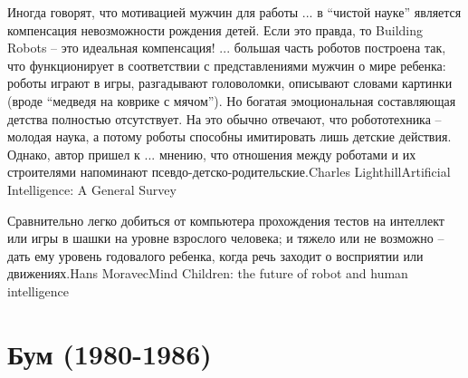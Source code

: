 \documentclass[24pt,pdf,hyperref={unicode},aspectratio=169]{beamer}
\begin{document}
\begin{frame}
\end{frame}

\begin{frame}
\citate
{\small
Иногда говорят, что мотивацией мужчин для работы ... в ``чистой науке'' является компенсация невозможности рождения детей. Если это правда, то Building Robots -- это идеальная компенсация! ... большая часть роботов построена так, что функционирует в соответствии с представлениями мужчин о мире ребенка: роботы играют в игры, разгадывают головоломки, описывают словами картинки (вроде ``медведя на коврике с мячом''). Но богатая эмоциональная составляющая детства полностью отсутствует. На это обычно отвечают, что робототехника -- молодая наука, а потому роботы способны имитировать лишь детские действия. Однако, автор пришел к ... мнению, что отношения между роботами и их строителями напоминают псевдо-детско-родительские.}{Charles Lighthill}{Artificial Intelligence: A General Survey}
\end{frame}

\begin{frame}
\end{frame}

\begin{frame}
\citate
{\small
Сравнительно легко добиться от компьютера прохождения тестов на интеллект или игры в шашки на уровне взрослого человека; и тяжело или не возможно -- дать ему уровень годовалого ребенка, когда речь заходит о восприятии или движениях.}{Hans Moravec}{Mind Children: the future of robot and human intelligence}
\end{frame}


\begin{frame}
\end{frame}

\section{Бум (1980-1986) }

\begin{frame}
\end{frame}


\begin{frame}
\begin{columns}
\end{columns}
\end{frame}
\end{document}
